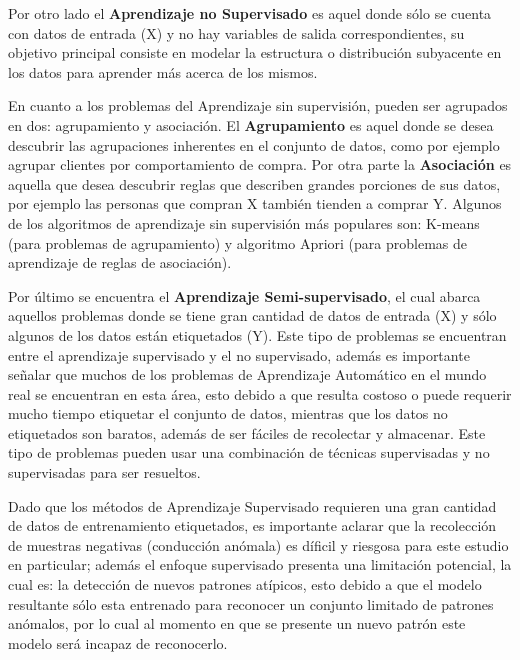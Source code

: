 \vspace{5mm} %

Por otro lado el \textbf{Aprendizaje no Supervisado} es aquel donde s\'{o}lo se cuenta con datos de entrada (X) y no hay variables de salida correspondientes, su objetivo principal consiste en modelar la estructura o distribuci\'{o}n subyacente en los datos para aprender m\'{a}s acerca de los mismos.

\vspace{5mm} %

En cuanto a los problemas del Aprendizaje sin supervisi\'{o}n, pueden ser agrupados en dos: agrupamiento y asociaci\'{o}n. El \textbf{Agrupamiento} es aquel donde se desea descubrir las agrupaciones inherentes en el conjunto de datos, como por ejemplo agrupar clientes por comportamiento de compra. Por otra parte la \textbf{Asociaci\'{o}n} es aquella que desea descubrir reglas que describen grandes porciones de sus datos, por ejemplo las personas que compran X tambi\'{e}n tienden a comprar Y. Algunos de los algoritmos de aprendizaje sin supervisi\'{o}n m\'{a}s populares son: K-means (para problemas de agrupamiento) y algoritmo Apriori (para problemas de aprendizaje de reglas de asociaci\'{o}n).

\vspace{5mm} %

Por \'{u}ltimo se encuentra el \textbf{Aprendizaje Semi-supervisado}, el cual abarca aquellos problemas donde se tiene gran cantidad de datos de entrada (X) y s\'{o}lo algunos de los datos est\'{a}n etiquetados (Y). Este tipo de problemas se encuentran entre el aprendizaje supervisado y el no supervisado, adem\'{a}s es importante se\~{n}alar que muchos de los problemas de Aprendizaje Autom\'{a}tico en el mundo real se encuentran en esta \'{a}rea, esto debido a que resulta costoso o puede requerir mucho tiempo etiquetar el conjunto de datos, mientras que los datos no etiquetados son baratos, adem\'{a}s de ser f\'{a}ciles de recolectar y almacenar. Este tipo de problemas pueden usar una combinaci\'{o}n de t\'{e}cnicas supervisadas y no supervisadas para ser resueltos.

\vspace{5mm} %

Dado que los m\'{e}todos de Aprendizaje Supervisado requieren una gran cantidad de datos de entrenamiento etiquetados, es importante aclarar que la recolecci\'{o}n de muestras negativas (conducci\'{o}n an\'{o}mala) es d\'{i}ficil y riesgosa para este estudio en particular; adem\'{a}s el enfoque supervisado presenta una limitaci\'{o}n potencial, la cual es: la detecci\'{o}n de nuevos patrones at\'{i}picos, esto debido a que el modelo resultante s\'{o}lo esta entrenado para reconocer un conjunto limitado de patrones an\'{o}malos, por lo cual al momento en que se presente un nuevo patr\'{o}n este modelo ser\'{a} incapaz de reconocerlo.

